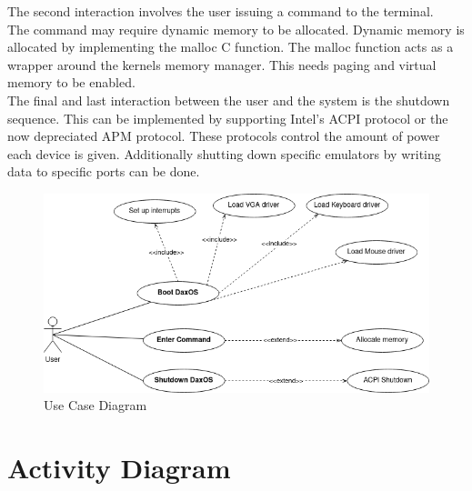 \begin{flushleft}
The second interaction involves the user issuing a command to the terminal. \\
The command may require dynamic memory to be allocated. Dynamic memory is
allocated by implementing the malloc C function. The malloc function acts as a
wrapper around the kernels memory manager. This needs paging and virtual
memory to be enabled.\\
The final and last interaction between the user and the system is the shutdown
sequence. This can be implemented by supporting Intel's ACPI protocol or the now
depreciated APM protocol. These protocols control the amount of power each device
is given. Additionally shutting down specific emulators by writing data to specific
ports can be done.

\end{flushleft}




\begin{figure}[h!]
	\includegraphics[width=\textwidth,height=\textheight,keepaspectratio]{use_case}
	\caption{Use Case Diagram}
\end{figure}

\pagebreak

\section{Activity Diagram}

